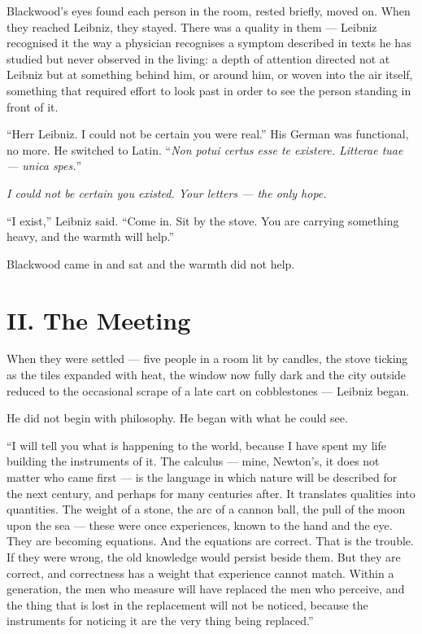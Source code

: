 Blackwood's eyes found each person in the room, rested briefly, moved on. When they reached Leibniz, they stayed. There was a quality in them --- Leibniz recognised it the way a physician recognises a symptom described in texts he has studied but never observed in the living: a depth of attention directed not at Leibniz but at something behind him, or around him, or woven into the air itself, something that required effort to look past in order to see the person standing in front of it.

``Herr Leibniz. I could not be certain you were real.'' His German was functional, no more. He switched to Latin. ``\emph{Non potui certus esse te existere. Litterae tuae --- unica spes.}''

\emph{I could not be certain you existed. Your letters --- the only hope.}

``I exist,'' Leibniz said. ``Come in. Sit by the stove. You are carrying something heavy, and the warmth will help.''

Blackwood came in and sat and the warmth did not help.


\section*{II. The Meeting}

When they were settled --- five people in a room lit by candles, the stove ticking as the tiles expanded with heat, the window now fully dark and the city outside reduced to the occasional scrape of a late cart on cobblestones --- Leibniz began.

He did not begin with philosophy. He began with what he could see.

``I will tell you what is happening to the world, because I have spent my life building the instruments of it. The calculus --- mine, Newton's, it does not matter who came first --- is the language in which nature will be described for the next century, and perhaps for many centuries after. It translates qualities into quantities. The weight of a stone, the arc of a cannon ball, the pull of the moon upon the sea --- these were once experiences, known to the hand and the eye. They are becoming equations. And the equations are correct. That is the trouble. If they were wrong, the old knowledge would persist beside them. But they are correct, and correctness has a weight that experience cannot match. Within a generation, the men who measure will have replaced the men who perceive, and the thing that is lost in the replacement will not be noticed, because the instruments for noticing it are the very thing being replaced.''

